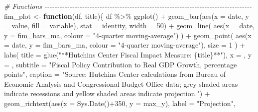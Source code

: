 \documentclass[
]{article}
\newenvironment{Shaded}{\begin{snugshade}}{\end{snugshade}}
\newcommand{\AttributeTok}[1]{\textcolor[rgb]{0.77,0.63,0.00}{#1}}
\newcommand{\CommentTok}[1]{\textcolor[rgb]{0.56,0.35,0.01}{\textit{#1}}}
\newcommand{\ControlFlowTok}[1]{\textcolor[rgb]{0.13,0.29,0.53}{\textbf{#1}}}
\newcommand{\DecValTok}[1]{\textcolor[rgb]{0.00,0.00,0.81}{#1}}
\newcommand{\FunctionTok}[1]{\textcolor[rgb]{0.00,0.00,0.00}{#1}}
\newcommand{\NormalTok}[1]{#1}
\newcommand{\OtherTok}[1]{\textcolor[rgb]{0.56,0.35,0.01}{#1}}
\newcommand{\SpecialCharTok}[1]{\textcolor[rgb]{0.00,0.00,0.00}{#1}}
\newcommand{\StringTok}[1]{\textcolor[rgb]{0.31,0.60,0.02}{#1}}
\begin{document}
\begin{Shaded}
\begin{Highlighting}[]
\CommentTok{\# Functions {-}{-}{-}{-}{-}{-}{-}{-}{-}{-}{-}{-}{-}{-}{-}{-}{-}{-}{-}{-}{-}{-}{-}{-}{-}{-}{-}{-}{-}{-}{-}{-}{-}{-}{-}{-}{-}{-}{-}{-}{-}{-}{-}{-}{-}{-}{-}{-}{-}{-}{-}{-}{-}{-}{-}{-}{-}{-}{-}{-}{-}{-}{-}{-}{-}{-}{-}{-}{-}{-}{-}{-}{-}{-}{-}{-}{-}{-}{-}{-}{-}{-}{-}}
\NormalTok{fim\_plot }\OtherTok{\textless{}{-}}
  \ControlFlowTok{function}\NormalTok{(df, title)\{}
\NormalTok{    df }\SpecialCharTok{\%\textgreater{}\%}
      \FunctionTok{ggplot}\NormalTok{() }\SpecialCharTok{+}
      \FunctionTok{geom\_bar}\NormalTok{(}\FunctionTok{aes}\NormalTok{(}\AttributeTok{x =}\NormalTok{ date, }\AttributeTok{y =}\NormalTok{ value, }\AttributeTok{fill =}\NormalTok{ variable),}
               \AttributeTok{stat =} \StringTok{\textquotesingle{}identity\textquotesingle{}}\NormalTok{, }\AttributeTok{width =} \DecValTok{50}\NormalTok{) }\SpecialCharTok{+}
      \FunctionTok{geom\_line}\NormalTok{(}
        \FunctionTok{aes}\NormalTok{(}\AttributeTok{x =}\NormalTok{ date,}
            \AttributeTok{y =}\NormalTok{ fim\_bars\_ma,}
            \AttributeTok{colour =} \StringTok{"4{-}quarter moving{-}average"}\NormalTok{)}
\NormalTok{      ) }\SpecialCharTok{+}
      \FunctionTok{geom\_point}\NormalTok{(}
        \FunctionTok{aes}\NormalTok{(}\AttributeTok{x =}\NormalTok{ date,}
            \AttributeTok{y =}\NormalTok{ fim\_bars\_ma,}
            \AttributeTok{colour =} \StringTok{"4{-}quarter moving{-}average"}\NormalTok{), }\AttributeTok{size =} \DecValTok{1}
\NormalTok{      ) }\SpecialCharTok{+}
      \FunctionTok{labs}\NormalTok{(}
        \AttributeTok{title =} \FunctionTok{glue}\NormalTok{(}\StringTok{"**Hutchins Center Fiscal Impact Measure: \{title\}**"}\NormalTok{),}
        \AttributeTok{x =} \StringTok{\textquotesingle{}\textquotesingle{}}\NormalTok{,}
        \AttributeTok{y =} \StringTok{\textquotesingle{}\textquotesingle{}}\NormalTok{,}
        \AttributeTok{subtitle =} \StringTok{"Fiscal Policy Contribution to Real GDP Growth, percentage points"}\NormalTok{,}
        \AttributeTok{caption =} \StringTok{"Source: Hutchins Center calculations from Bureau of Economic Analysis }
\StringTok{        and Congressional Budget Office data; grey shaded areas indicate recessions }
\StringTok{        and yellow shaded areas indicate projection."}\NormalTok{) }\SpecialCharTok{+}
      \FunctionTok{geom\_richtext}\NormalTok{(}\FunctionTok{aes}\NormalTok{(}\AttributeTok{x =} \FunctionTok{Sys.Date}\NormalTok{()}\SpecialCharTok{+}\DecValTok{350}\NormalTok{,}
                    \AttributeTok{y =}\NormalTok{ max\_y), }
                \AttributeTok{label =} \StringTok{"Projection"}\NormalTok{,}

\end{Highlighting}
\end{Shaded}
\end{document}
